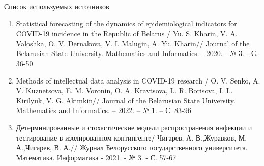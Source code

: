\documentclass[notheorems]{beamer}
\begin{document}

\begin{frame}
	{Список используемых источников}
	\begin{enumerate}
		\item Statistical forecasting of the dynamics of epidemiological indicators for COVID-19 incidence in the Republic of Belarus / Yu. S. Kharin, V. A. Valoshka, O. V. Dernakova, V. I. Malugin, A. Yu. Kharin// Journal of the Belarusian State University. Mathematics and Informatics. - 2020. - № 3. - С. 36-50
		\item Methods of intellectual data analysis in COVID-19 research / O. V. Senko, A. V. Kuznetsova, E. M. Voronin, O. A. Kravtsova, L. R. Borisova, I. L. Kirilyuk, V. G. Akimkin// Journal of the Belarusian State University. Mathematics and Informatics. – 2022. – № 1. – С. 83-96
		\item Детерминированные и стохастические модели распространения инфекции и тестирование в изолированном контингенте/ Чигарев, А. В.,Журавков, М. А.,Чигарев, В. А.// Журнал Белорусского государственного университета. Математика. Информатика - 2021. - № 3. - С. 57-67
	\end{enumerate}
\end{frame}

\end{document}
